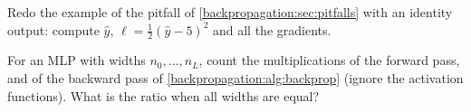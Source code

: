 \begin{notechapter}
\begin{exercise}\label{backpropagation:exr:4}
Redo the example of the pitfall of \cref{backpropagation:sec:pitfalls} with an identity output: compute $\hat y$,
$\ell = \frac12(\hat y - 5)^2$ and all the gradients.
\end{exercise}

\begin{exercise}\label{backpropagation:exr:5}
For an MLP with widths $n_0,\dots,n_L$, count the multiplications of the forward pass, and of the
backward pass of \cref{backpropagation:alg:backprop} (ignore the activation functions). What
is the ratio when all widths are equal?
\end{exercise}
\end{notechapter}

